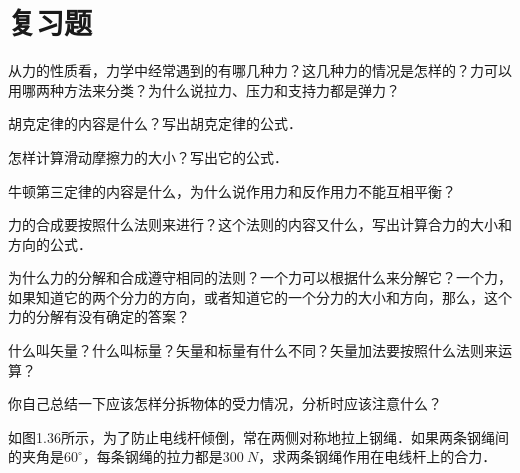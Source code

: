 \section*{复习题}
\begin{QsNum}
    \item 从力的性质看，力学中经常遇到的有哪几种力？这几种力的情况是怎样的？力可以用哪两种方法来分类？为什么说拉力、压力和支持力都是弹力？
    \item
          胡克定律的内容是什么？写出胡克定律的公式．
    \item
          怎样计算滑动摩擦力的大小？写出它的公式．
    \item 牛顿第三定律的内容是什么，为什么说作用力和反作用力不能互相平衡？
    \item
          力的合成要按照什么法则来进行？这个法则的内容又什么，写出计算合力的大小和方向的公式．
    \item
          为什么力的分解和合成遵守相同的法则？一个力可以根据什么来分解它？一个力，如果知道它的两个分力的方向，或者知道它的一个分力的大小和方向，那么，这个力的分解有没有确定的答案？
    \item
          什么叫矢量？什么叫标量？矢量和标量有什么不同？矢量加法要按照什么法则来运算？
    \item
          你自己总结一下应该怎样分拆物体的受力情况，分析时应该注意什么？
    \item 如图1.36所示，为了防止电线杆倾倒，常在两侧对称地拉上钢绳．如果两条钢绳间的夹角是$60^\circ$，每条钢绳的拉力都是$\qty{300}{N}$，求两条钢绳作用在电线杆上的合力．
          \begin{figure}[H]
              \centering
              \caption{}
          \end{figure}


\end{QsNum}
